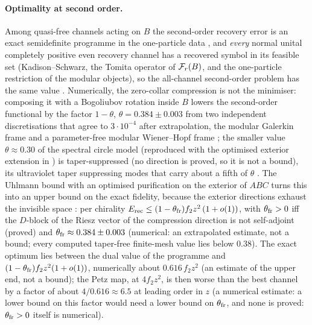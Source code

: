 \paragraph{Optimality at second order.} Among quasi-free channels acting on $B$ the second-order recovery error is an exact semidefinite programme in the one-particle data \cite{RigorS8}, and \emph{every} normal unital completely positive even recovery channel has a recovered symbol in its feasible set (Kadison--Schwarz, the Tomita operator of $\mathcal F_r(B)$, and the one-particle restriction of the modular objects), so the all-channel second-order problem has the same value \cite{RigorAll}.  Numerically, the zero-collar compression is not the minimiser: composing it with a Bogoliubov rotation inside $B$ lowers the second-order functional by the factor $1-\theta$, $\theta=0.384\pm0.003$ from two independent discretisations that agree to $3\cdot10^{-4}$ after extrapolation, the modular Galerkin frame \cite{RigorAll} and a parameter-free modular Wiener--Hopf frame \cite{RigorF3}; the smaller value $\theta\approx0.30$ of the spectral circle model \cite{RigorS10} (reproduced with the optimised exterior extension in \cite{RigorE2}) is taper-suppressed (no direction is proved, so it is not a bound), its ultraviolet taper suppressing modes that carry about a fifth of $\theta$ \cite{RigorF3}.  The Uhlmann bound with an optimised purification on the exterior of $ABC$ turns this into an upper bound on the exact fidelity, because the exterior directions exhaust the invisible space \cite{RigorE1}: per chirality $E_{\rm rec}\le(1-\theta_{\rm fr})f_2z^2\,(1+o(1))$, with $\theta_{\rm fr}>0$ iff the $D$-block of the Riesz vector of the compression direction is not self-adjoint (proved) and $\theta_{\rm fr}\approx0.384\pm0.003$ (numerical: an extrapolated estimate, not a bound; every computed taper-free finite-mesh value lies below $0.38$).  The exact optimum lies between the dual value of the programme and $(1-\theta_{\rm fr})f_2z^2(1+o(1))$, numerically about $0.616\,f_2z^2$ (an estimate of the upper end, not a bound); the Petz map, at $4f_2z^2$, is then worse than the best channel by a factor of about $4/0.616\approx6.5$ at leading order in $z$ (a numerical estimate: a lower bound on this factor would need a lower bound on $\theta_{\rm fr}$, and none is proved: $\theta_{\rm fr}>0$ itself is numerical).

